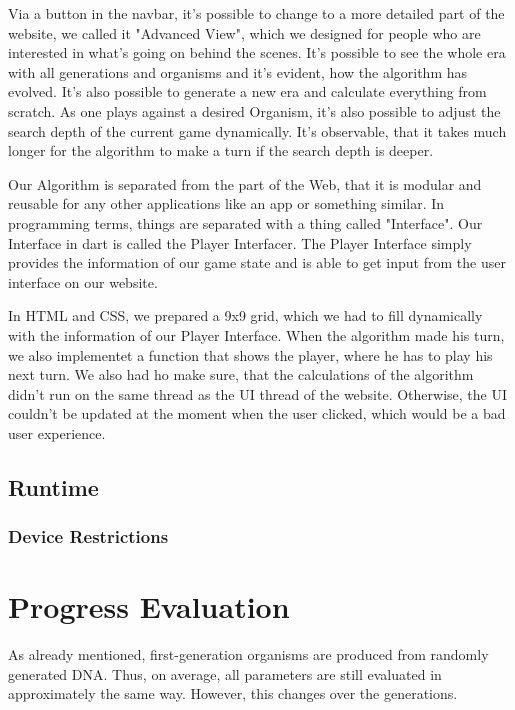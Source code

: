Via a button in the navbar, it's possible to change to a more detailed  part of the website, we called it "Advanced View", which we designed for people who are interested in what's going on behind the scenes. It's possible to see the whole era with all generations and organisms and it's evident, how the algorithm has evolved. It's also possible to generate a new era and calculate everything from scratch. As one plays against a desired Organism, it's also possible to adjust the search depth of the current game dynamically. It's observable, that it takes much longer for the algorithm to make a turn if the search depth is deeper. %

Our Algorithm is separated from the part of the Web, that it is modular and reusable for any other applications like an app or something similar. In programming terms, things are separated with a thing called "Interface". Our Interface in dart is called the Player Interfacer. The Player Interface simply provides the information of our game state and is able to get input from the user interface on our website.

In HTML and CSS, we prepared a 9x9 grid, which we had to fill dynamically with the information of our Player Interface. When the algorithm made his turn, we also implementet a function that shows the player, where he has to play his next turn. 
We also had ho make sure, that the calculations of the algorithm didn't run on the same thread as the UI thread of the website. Otherwise, the UI couldn't be updated at the moment when the user clicked, which would be a bad user experience. 


\subsection{ Runtime } 

\subsubsection{ Device Restrictions}


\section{Progress Evaluation}
As already mentioned, first-generation organisms are produced from randomly generated DNA. Thus, on average, all parameters are still evaluated in approximately the same way. However, this changes over the generations.


